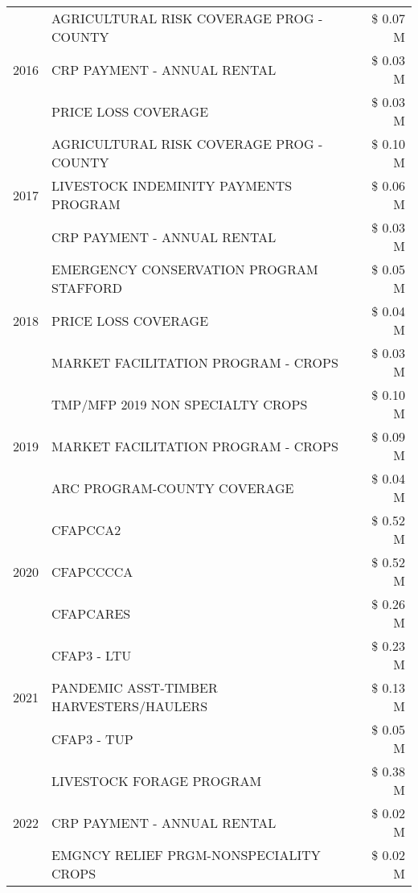 \begin{tabular}{llr}
\cline{1-3}
\multirow[t]{3}{*}{2016} & AGRICULTURAL RISK COVERAGE PROG - COUNTY & \$ 0.07 M \\
 & CRP PAYMENT - ANNUAL RENTAL & \$ 0.03 M \\
 & PRICE LOSS COVERAGE & \$ 0.03 M \\
\cline{1-3}
\multirow[t]{3}{*}{2017} & AGRICULTURAL RISK COVERAGE PROG - COUNTY & \$ 0.10 M \\
 & LIVESTOCK INDEMINITY PAYMENTS PROGRAM & \$ 0.06 M \\
 & CRP PAYMENT - ANNUAL RENTAL & \$ 0.03 M \\
\cline{1-3}
\multirow[t]{3}{*}{2018} & EMERGENCY CONSERVATION PROGRAM STAFFORD & \$ 0.05 M \\
 & PRICE LOSS COVERAGE & \$ 0.04 M \\
 & MARKET FACILITATION PROGRAM - CROPS & \$ 0.03 M \\
\cline{1-3}
\multirow[t]{3}{*}{2019} & TMP/MFP 2019 NON SPECIALTY CROPS & \$ 0.10 M \\
 & MARKET FACILITATION PROGRAM - CROPS & \$ 0.09 M \\
 & ARC PROGRAM-COUNTY COVERAGE & \$ 0.04 M \\
\cline{1-3}
\multirow[t]{3}{*}{2020} & CFAPCCA2 & \$ 0.52 M \\
 & CFAPCCCCA & \$ 0.52 M \\
 & CFAPCARES & \$ 0.26 M \\
\cline{1-3}
\multirow[t]{3}{*}{2021} & CFAP3 - LTU & \$ 0.23 M \\
 & PANDEMIC ASST-TIMBER HARVESTERS/HAULERS & \$ 0.13 M \\
 & CFAP3 - TUP & \$ 0.05 M \\
\cline{1-3}
\multirow[t]{3}{*}{2022} & LIVESTOCK FORAGE PROGRAM & \$ 0.38 M \\
 & CRP PAYMENT - ANNUAL RENTAL & \$ 0.02 M \\
 & EMGNCY RELIEF PRGM-NONSPECIALITY CROPS & \$ 0.02 M \\
\cline{1-3}
\bottomrule
\end{tabular}
